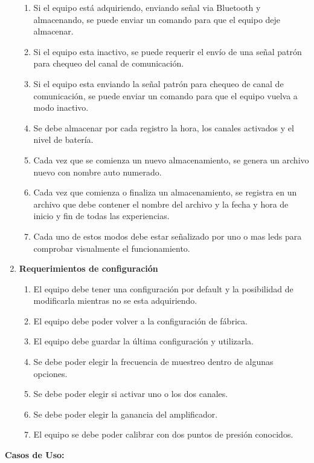 \begin{enumerate}
\begin{enumerate}[label*=\arabic*.]
		\item Si el equipo está adquiriendo, enviando señal via Bluetooth y almacenando, se puede enviar un comando para que el equipo deje almacenar.
		\item Si el equipo esta inactivo, se puede requerir el envío de una señal patrón para chequeo del canal de comunicación.
		\item Si el equipo esta enviando la señal patrón para chequeo de canal de comunicación, se puede enviar un comando para que el equipo vuelva a modo inactivo.
		\item Se debe almacenar por cada registro la hora, los canales activados y el nivel de batería.
		\item Cada vez que se comienza un nuevo almacenamiento, se genera un archivo nuevo con nombre auto numerado.
		\item Cada vez que comienza o finaliza un almacenamiento, se registra en un archivo que debe contener el nombre del archivo y la fecha y hora de inicio y fin de todas las experiencias.
		\item Cada uno de estos modos debe estar señalizado por uno o mas leds para comprobar visualmente el funcionamiento.
	\end{enumerate}
	
	\item \textbf{Requerimientos de configuración}
	
	\begin{enumerate} [label*=\arabic*.]
		\item El equipo debe tener una configuración por default y la posibilidad de modificarla mientras no se esta adquiriendo.
		\item El equipo debe poder volver a la configuración de fábrica.
		\item El equipo debe guardar la última configuración y utilizarla.
		\item Se debe poder elegir la frecuencia de muestreo dentro de algunas opciones.
		\item Se debe poder elegir si activar uno o los dos canales.
		\item Se debe poder elegir la ganancia del amplificador.
		\item El equipo se debe poder calibrar con dos puntos de presión conocidos.		
	\end{enumerate}


\end{enumerate}

\textbf{Casos de Uso:}

